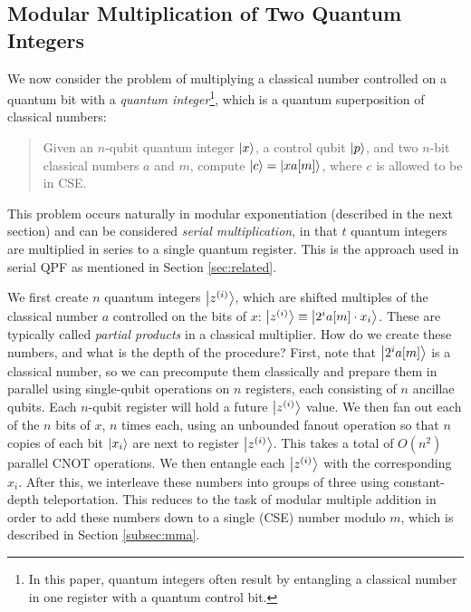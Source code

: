 \documentclass[twoside]{article}
\begin{document}
\subsection{Modular Multiplication of Two Quantum Integers}
\label{subsec:csa-mod-mult-qq}

We now consider the problem of multiplying a classical number controlled
on a quantum bit with a
\emph{quantum integer}\footnote{In this paper, quantum integers often result by entangling a classical number in one register with a quantum control bit.},
which is a
quantum superposition of classical numbers:

\begin{quote}
Given an $n$-qubit quantum integer $\left\vert{x}\right\rangle$, a control qubit $\left\vert{p}\right\rangle$,
and two $n$-bit classical numbers $a$
and $m$,
compute $\left\vert{c}\right\rangle = \left\vert{xa[m]}\right\rangle$, where $c$ is allowed to be in CSE.
\end{quote}

This problem occurs naturally in modular exponentiation (described in
the next section) and can be considered \emph{serial multiplication},
in that $t$ quantum integers are multiplied in series to a single
quantum register. This is the approach used in serial QPF as mentioned in
Section \ref{sec:related}.


We first create $n$ quantum integers $\left\vert{z^{(i)}}\right\rangle$,
which are shifted multiples of the classical number $a$ controlled on the bits
of $x$:
$\left\vert{z^{(i)}}\right\rangle \equiv \left\vert{2^i a[m] \cdot x_i }\right\rangle$.
These are typically called \emph{partial products} in a classical multiplier.
How do we create these numbers, and what is the depth of the procedure?
First, note that $\left\vert{2^i a[m]}\right\rangle$ is a classical number, so we can
precompute them classically and prepare them in parallel using single-qubit
operations
on $n$ registers, each consisting of $n$ ancillae qubits. Each $n$-qubit
register will hold a future $\left\vert{z^{(i)}}\right\rangle$ value.
We then fan out each of the
$n$ bits of $x$, $n$ times each, using an unbounded fanout operation so that
$n$ copies of each bit $\left\vert{x_i}\right\rangle$ are next to register $\left\vert{z^{(i)}}\right\rangle$.
This takes a total of $O(n^2)$ parallel CNOT operations.
We then entangle each $\left\vert{z^{(i)}}\right\rangle$ with the corresponding $x_i$.
After this, we interleave these numbers into groups of three using
constant-depth teleportation. This reduces to the task of modular
multiple addition in order to add these numbers down to a single
(CSE) number modulo $m$, which is described in Section \ref{subsec:mma}.
\end{document}
